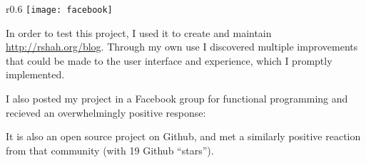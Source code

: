 
  \begin{wrapfigure}{r}{0.6\textwidth}
      \texttt{[image: facebook]}
    \centering
  \end{wrapfigure}

  In order to test this project, I used it to create and maintain \url{http://rshah.org/blog}. Through my own use I discovered multiple improvements that could be made to the user interface and experience, which I promptly implemented. 

  I also posted my project in a Facebook group for functional programming and recieved an overwhelmingly positive response: 


  It is also an open source project on Github, and met a similarly positive reaction from that community (with 19 Github ``stars''). 